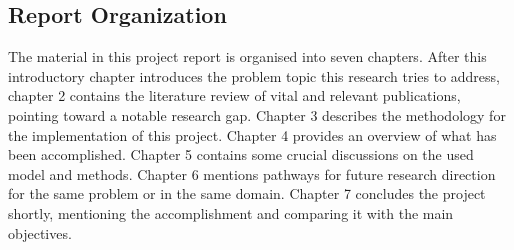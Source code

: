 
\subsection{Report Organization}
The material in this project report is organised into seven chapters. After this introductory chapter introduces the problem topic this research tries to address, chapter 2 contains the literature review of vital and relevant publications, pointing toward a notable research gap. Chapter 3 describes the methodology for the implementation of this project. Chapter 4 provides an overview of what has been accomplished. Chapter 5 contains some crucial discussions on the used model and methods. Chapter 6 mentions pathways for future research direction for the same problem or in the same domain. Chapter 7 concludes the project shortly, mentioning the accomplishment and comparing it with the main objectives.